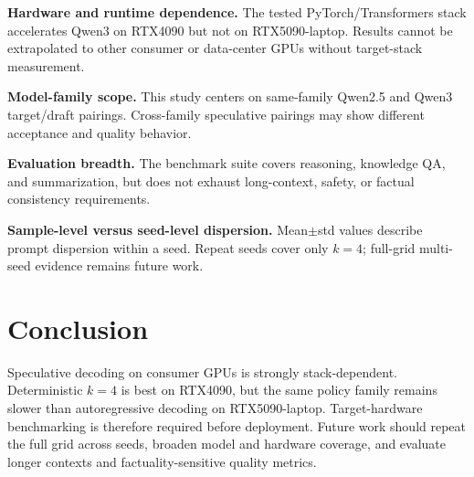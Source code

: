 \textbf{Hardware and runtime dependence.}
The tested PyTorch/Transformers stack accelerates Qwen3 on RTX4090 but not on
RTX5090-laptop. Results cannot be extrapolated to other consumer or data-center
GPUs without target-stack measurement.

\textbf{Model-family scope.}
This study centers on same-family Qwen2.5 and Qwen3 target/draft pairings.
Cross-family speculative pairings may show different acceptance and quality
behavior.

\textbf{Evaluation breadth.}
The benchmark suite covers reasoning, knowledge QA, and summarization, but does
not exhaust long-context, safety, or factual consistency requirements.

\textbf{Sample-level versus seed-level dispersion.}
Mean$\pm$std values describe prompt dispersion within a seed. Repeat seeds
cover only $k{=}4$; full-grid multi-seed evidence remains future work.

\section{Conclusion}
\label{sec:conclusion}

Speculative decoding on consumer GPUs is strongly stack-dependent.
Deterministic $k{=}4$ is best on RTX4090, but the same policy family remains
slower than autoregressive decoding on RTX5090-laptop. Target-hardware
benchmarking is therefore required before deployment. Future work should
repeat the full grid across seeds, broaden model and hardware coverage, and
evaluate longer contexts and factuality-sensitive quality metrics.
